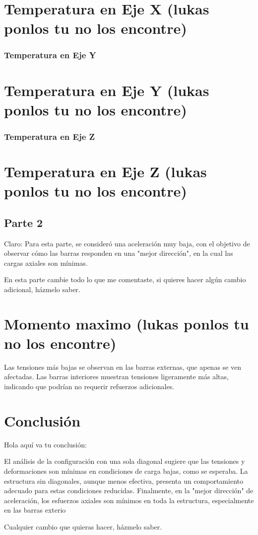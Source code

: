 \section*{Temperatura en Eje X (lukas ponlos tu no los encontre)}

\subsubsection{Temperatura en Eje Y}

\section*{Temperatura en Eje Y (lukas ponlos tu no los encontre)}

\subsubsection{Temperatura en Eje Z}

\section*{Temperatura en Eje Z (lukas ponlos tu no los encontre)}

\subsection{Parte 2}

Claro:
Para esta parte, se consideró una aceleración muy baja, con el objetivo de observar cómo las barras responden en una "mejor dirección", en la cual las cargas axiales son mínimas.

En esta parte cambie todo lo que me comentaste, si quieres hacer algún cambio adicional, házmelo saber.

\section*{Momento maximo (lukas ponlos tu no los encontre)}

Las tensiones más bajas se observan en las barras externas, que apenas se ven afectadas. Las barras interiores muestran tensiones ligeramente más altas, indicando que podrían no requerir refuerzos adicionales.

\section{Conclusión}

Hola aquí va tu conclusión:

El análisis de la configuración con una sola diagonal sugiere que las tensiones y deformaciones son mínimas en condiciones de carga bajas, como se esperaba. La estructura sin diagonales, aunque menos efectiva, presenta un comportamiento adecuado para estas condiciones reducidas. Finalmente, en la "mejor dirección" de aceleración, los esfuerzos axiales son mínimos en toda la estructura, especialmente en las barras exterio

Cualquier cambio que quieras hacer, házmelo saber.